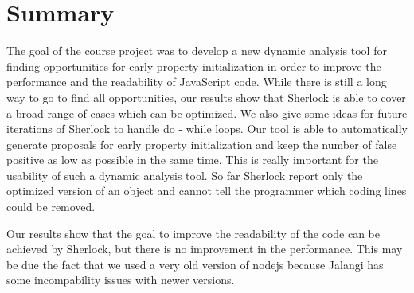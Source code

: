 \section{Summary}
The goal of the course project was to develop a new dynamic analysis tool for finding opportunities 
for early property initialization in order to improve the performance and the readability of 
JavaScript code. While there is still a long way to go to find all opportunities, our results 
show that Sherlock is able to cover a broad range of cases which can be optimized. We also give 
some ideas for future iterations of Sherlock to handle do - while loops. Our tool is able to 
automatically generate proposals for early property initialization and keep the number of false 
positive as low as possible in the same time. This is really important for the usability of such a 
dynamic analysis tool. So far Sherlock report only the optimized version of an object and cannot
tell the programmer which coding lines could be removed.

Our results show that the goal to improve the readability of the code can 
be achieved by Sherlock, but there is no improvement in the performance. This may be due the fact
 that we used a very old version of nodejs because Jalangi has some incompability issues with newer versions.  


\label{sec:summary}